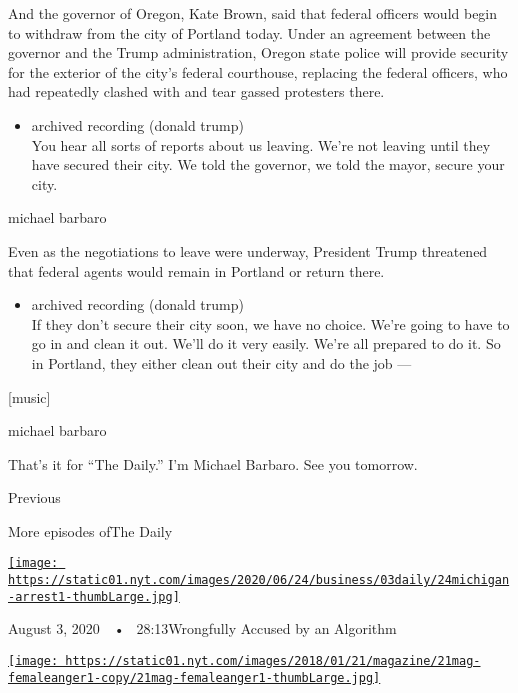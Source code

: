 And the governor of Oregon, Kate Brown, said that federal officers would
begin to withdraw from the city of Portland today. Under an agreement
between the governor and the Trump administration, Oregon state police
will provide security for the exterior of the city's federal courthouse,
replacing the federal officers, who had repeatedly clashed with and tear
gassed protesters there.

\begin{itemize}
\tightlist
\item
  archived recording (donald trump)\\
  You hear all sorts of reports about us leaving. We're not leaving
  until they have secured their city. We told the governor, we told the
  mayor, secure your city.
\end{itemize}

michael barbaro

Even as the negotiations to leave were underway, President Trump
threatened that federal agents would remain in Portland or return there.

\begin{itemize}
\tightlist
\item
  archived recording (donald trump)\\
  If they don't secure their city soon, we have no choice. We're going
  to have to go in and clean it out. We'll do it very easily. We're all
  prepared to do it. So in Portland, they either clean out their city
  and do the job ---
\end{itemize}

{[}music{]}

michael barbaro

That's it for ``The Daily.'' I'm Michael Barbaro. See you tomorrow.

Previous

More episodes ofThe Daily

\href{https://www.nytimes.com/2020/08/03/podcasts/the-daily/algorithmic-justice-racism.html?action=click\&module=audio-series-bar\&region=header\&pgtype=Article}{\texttt{[image: https://static01.nyt.com/images/2020/06/24/business/03daily/24michigan-arrest1-thumbLarge.jpg]}}

August 3, 2020~~•~ 28:13Wrongfully Accused by an Algorithm

\href{https://www.nytimes.com/2020/08/02/podcasts/the-daily/on-female-rage.html?action=click\&module=audio-series-bar\&region=header\&pgtype=Article}{\texttt{[image: https://static01.nyt.com/images/2018/01/21/magazine/21mag-femaleanger1-copy/21mag-femaleanger1-thumbLarge.jpg]}}


